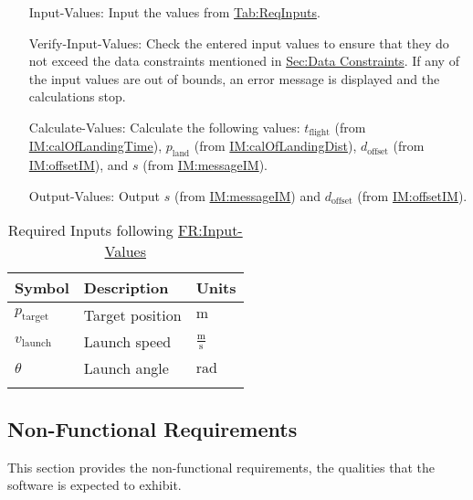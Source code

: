 \documentclass[12pt]{article}
\begin{document}
\begin{itemize}
\item[Input-Values:\phantomsection\label{inputValues}]{Input the values from \hyperref[Table:ReqInputs]{Tab:ReqInputs}.}
\item[Verify-Input-Values:\phantomsection\label{verifyInVals}]{Check the entered input values to ensure that they do not exceed the data constraints mentioned in \hyperref[Sec:DataConstraints]{Sec:Data Constraints}. If any of the input values are out of bounds, an error message is displayed and the calculations stop.}
\item[Calculate-Values:\phantomsection\label{calcValues}]{Calculate the following values: ${t_{\text{flight}}}$ (from \hyperref[IM:calOfLandingTime]{IM:calOfLandingTime}), ${p_{\text{land}}}$ (from \hyperref[IM:calOfLandingDist]{IM:calOfLandingDist}), ${d_{\text{offset}}}$ (from \hyperref[IM:offsetIM]{IM:offsetIM}), and $s$ (from \hyperref[IM:messageIM]{IM:messageIM}).}
\item[Output-Values:\phantomsection\label{outputValues}]{Output $s$ (from \hyperref[IM:messageIM]{IM:messageIM}) and ${d_{\text{offset}}}$ (from \hyperref[IM:offsetIM]{IM:offsetIM}).}
\end{itemize}
\begin{longtable}{l l l}
\toprule
\textbf{Symbol} & \textbf{Description} & \textbf{Units}
\\
\midrule
\endhead
${p_{\text{target}}}$ & Target position & ${\text{m}}$
\\
${v_{\text{launch}}}$ & Launch speed & $\frac{\text{m}}{\text{s}}$
\\
$θ$ & Launch angle & ${\text{rad}}$
\\
\bottomrule
\caption{Required Inputs following \hyperref[inputValues]{FR:Input-Values}}
\label{Table:ReqInputs}
\end{longtable}
\subsection{Non-Functional Requirements}
\label{Sec:NFRs}
This section provides the non-functional requirements, the qualities that the software is expected to exhibit.
\end{document}
